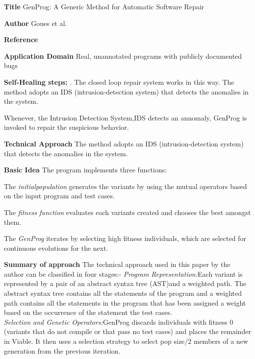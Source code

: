 \begin{compactitem}
\item[\textbf{Title}]GenProg: A Generic Method for Automatic Software Repair

\item[\textbf{Author}]
Goues et al.   
\item[\textbf{Reference}]  

\cite{le_goues_genprog:_2012}

\item[\textbf{Application Domain}]
Real, unannotated programs with publicly documented bugs

\item[\textbf{Self-Healing steps:}]. The closed loop repair system works in this way. The method adopts an IDS (intrusion-detection system) that detects the anomalies in the system.

Whenever, the Intrusion Detection System,IDS detects an annomaly, GenProg is invoked to repair the suspicious behavior.

\item [\textbf{Technical Approach}] The method adopts an IDS (intrusion-detection system) that detects the anomalies in the system.

\item[\textbf{Basic Idea}] The program implements three functions:

The \textit{initialpopulation} generates the variants by using the mutual operators based on the input program and test cases.

The \textit{fitness function} evaluates each variants created and chooses the best amongst them.

The \textit{GenProg} iterates by selecting high fitness individuals, which are selected for continuous evolutions for the next.

\item[\textbf{Summary of approach}]
The technical approach used in this paper by the author can be classified in four stages:-
\textit{Program Representation:}Each variant is represented by a pair of an abstract syntax tree   (AST)and a weighted path. The abstract syntax tree contains all the statements of the program and a weighted path contains all the statements in the program that has been assigned a weight based on the occurrence of the statement the test cases.\\

\textit{Selection and Genetic Operators:}GenProg discards individuals with fitness 0 (variants that do not compile or that pass no test cases) and places the remainder in Viable. It then uses a selection strategy to select pop size/2 members of a new generation from the previous iteration.\\ 


\end{compactitem}
